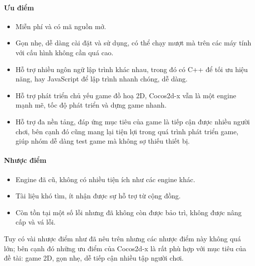 \documentclass[12pt,a4paper]{article}
\begin{document}
  \paragraph{Ưu điểm}
  \begin{itemize}
      \item Miễn phí và có mã nguồn mở.
      \item Gọn nhẹ, dễ dàng cài đặt và sử dụng, có thể chạy mượt mà trên các máy tính với cấu hình không cần quá cao.
      \item Hỗ trợ nhiều ngôn ngữ lập trình khác nhau, trong đó có C++ để tối ưu hiệu năng, hay JavaScript để lập trình nhanh chóng, dễ dàng.
      \item Hỗ trợ phát triển chủ yếu game đồ hoạ 2D, Cocos2d-x vẫn là một engine mạnh mẽ, tốc độ phát triển và dựng game nhanh.
      \item Hỗ trợ đa nền tảng, đáp ứng mục tiêu của game là tiếp cận được nhiều người chơi, bên cạnh đó cũng mang lại tiện lợi trong quá trình phát triển game, giúp nhóm dễ dàng test game mà không sợ thiếu thiết bị.
  \end{itemize}

  \paragraph{Nhược điểm}
  \begin{itemize}
      \item Engine đã cũ, không có nhiều tiện ích như các engine khác.
      \item Tài liệu khó tìm, ít nhận được sự hỗ trợ từ cộng đồng.
      \item Còn tồn tại một số lỗi nhưng đã không còn được bảo trì, không được nâng cấp và vá lỗi.
  \end{itemize}

  Tuy có vài nhược điểm như đã nêu trên nhưng các nhược điểm này không quá lớn; bên cạnh đó những ưu điểm của Cocos2d-x là rất phù hợp với mục tiêu của đề tài: game 2D, gọn nhẹ, dễ tiếp cận nhiều tập người chơi.
  
\end{document}

